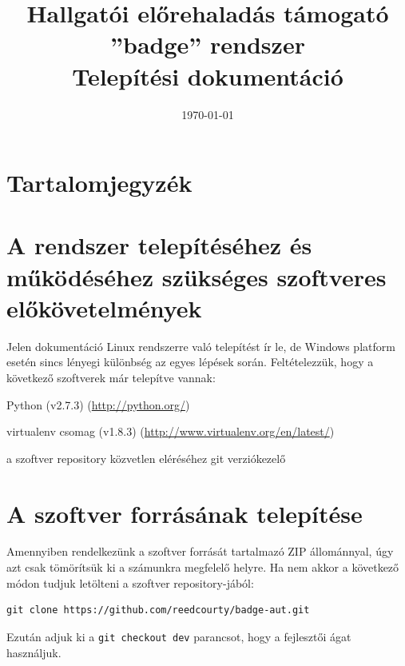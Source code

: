 \documentclass[a4paper,10pt,titlepage]{article}
\newcommand{\szerzo}{}
\newcommand{\cim}{Hallgatói előrehaladás támogató ''badge'' rendszer \\ Telepítési dokumentáció}
\newenvironment{sajat_itemize}
{
	\begin{itemize}
	\setlength{\itemsep}{0pt}
}
{
	\end{itemize}
}
\begin{document}


\begin{titlepage}

\title{\cim}
\author{\szerzo}
\date{\today}

\end{titlepage}
\maketitle

\section*{Tartalomjegyzék}
\makeatletter
{}
\makeatother

\section{A rendszer telepítéséhez és működéséhez szükséges szoftveres előkövetelmények}

Jelen dokumentáció Linux rendszerre való telepítést ír le, de Windows platform esetén sincs lényegi különbség az egyes lépések során. Feltételezzük, hogy a következő szoftverek már telepítve vannak:
\begin{sajat_itemize}
\item Python (v2.7.3) (\url{http://python.org/})
\item virtualenv csomag (v1.8.3) (\url{http://www.virtualenv.org/en/latest/})
\item a szoftver repository közvetlen eléréséhez git verziókezelő
\end{sajat_itemize}

\section{A szoftver forrásának telepítése}

Amennyiben rendelkezünk a szoftver forrását tartalmazó ZIP állománnyal, úgy azt csak tömörítsük ki a számunkra megfelelő helyre. Ha nem akkor a következő módon tudjuk letölteni a szoftver repository-jából:
\begin{verbatim}
git clone https://github.com/reedcourty/badge-aut.git
\end{verbatim}

Ezután adjuk ki a \texttt{git checkout dev} parancsot, hogy a fejlesztői ágat használjuk.
\end{document}

